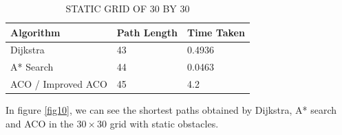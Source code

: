 \documentclass[conference]{IEEEtran}
\begin{document}
\begin{table}[H]
\caption{STATIC GRID OF 30 BY 30}
\begin{center}
\begin{tabular}{|l|l|l|}
\hline
Algorithm            & Path   Length & Time   Taken \\ \hline
Dijkstra            & 43            & 0.4936       \\ \hline
A*   Search          & 44            & 0.0463       \\ \hline
ACO   / Improved ACO & 45            & 4.2          \\ \hline
\end{tabular}
\label{table4}
\end{center}
\end{table}

In figure \ref{fig10}, we can see the shortest paths obtained by Dijkstra, A* search and ACO in the $30 \times 30$ grid with static obstacles. 
\end{document}
